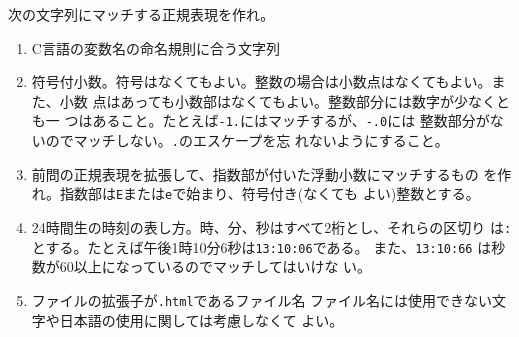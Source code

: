 \begin{Prob}\upshape\Must
次の文字列にマッチする正規表現を作れ。
\begin{enumerate}
 \item C言語の変数名の命名規則に合う文字列\ifText\\[0.05\textheight]\fi
 \item 符号付小数。符号はなくてもよい。整数の場合は小数点はなくてもよい。また、小数
       点はあっても小数部はなくてもよい。整数部分には数字が少なくとも一
       つはあること。たとえば\Verb+-1.+にはマッチするが、\Verb+-.0+には
       整数部分がないのでマッチしない。\Verb+.+のエスケープを忘
       れないようにすること。\ifText\\[0.05\textheight]\fi
 \item 前問の正規表現を拡張して、指数部が付いた浮動小数にマッチするもの
       を作れ。指数部は\Verb+E+または\Verb+e+で始まり、符号付き(なくても
       よい)整数とする。\ifText\\[0.05\textheight]\fi
 \item 24時間生の時刻の表し方。時、分、秒はすべて2桁とし、それらの区切り
       は\Verb+:+とする。たとえば午後1時10分6秒は\Verb+13:10:06+である。
  また、\Verb+13:10:66+ は秒数が60以上になっているのでマッチしてはいけな
       い。
       \ifText\\[0.05\textheight]\fi
 \item ファイルの拡張子が\texttt{.html}であるファイル名
			 \ifText ファイル名には使用できない文字や日本語の使用に関しては考慮しなくて
			 よい。\\[0.05\textheight]\fi
\end{enumerate}
\end{Prob}
